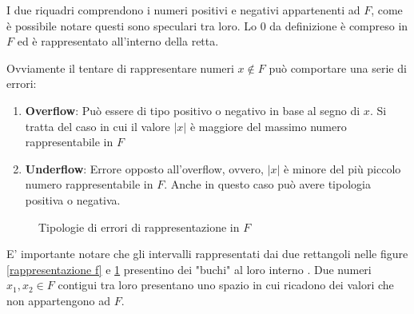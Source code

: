 \documentclass[12pt, a4paper]{book}
\theoremstyle{definition}
\begin{document}
\begin{flushleft}
I due riquadri comprendono i numeri positivi e negativi appartenenti ad $F$, come è possibile notare questi sono speculari tra loro. Lo 0 da definizione è compreso in $F$ ed è rappresentato all'interno della retta.

Ovviamente il tentare di rappresentare numeri $x \notin F$ può comportare una serie di errori:
\begin{enumerate}
	\item \textbf{Overflow}: Può essere di tipo positivo o negativo in base al segno di $x$.  Si tratta del caso in cui il valore  $ |x| $ è maggiore del massimo numero rappresentabile in $F$
	\item \textbf{Underflow}: Errore opposto all'overflow, ovvero, $|x|$ è minore del più piccolo numero rappresentabile in $F$. Anche in questo caso può avere tipologia positiva o negativa.
\end{enumerate}

\begin{figure}[h!]
\centering
{}
\caption{Tipologie di errori di rappresentazione in $F$}
\label{rappresentazione errori f}
\end{figure}
 
E' importante notare che gli intervalli rappresentati dai due rettangoli nelle figure \ref{rappresentazione f} e \ref{rappresentazione errori f} presentino dei "buchi" al loro interno . Due numeri $x_{1}, x_{2} \in F$  contigui tra loro presentano uno spazio in cui ricadono dei valori che non appartengono ad $F$.
 

\end{flushleft}
\end{document}
